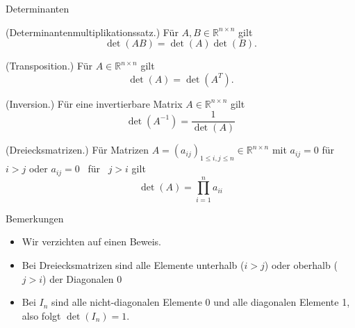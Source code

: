 \documentclass[
  8pt,
  ignorenonframetext,
]{beamer}
\providecommand{\tightlist}{%
  \setlength{\itemsep}{0pt}\setlength{\parskip}{0pt}}
\begin{document}
\begin{frame}{Determinanten}
\protect\hypertarget{determinanten-5}{}
\footnotesize
\begin{theorem}
\normalfont
(Determinantenmultiplikationssatz.) Für $A,B \in \mathbb{R}^{n \times n}$ gilt
\begin{equation}
\det(AB) = \det(A)\det(B).
\end{equation}

(Transposition.) Für $A \in \mathbb{R}^{n \times n}$ gilt
\begin{equation}
\det(A) = \det\left(A^T\right).
\end{equation}

(Inversion.) Für eine invertierbare Matrix $A \in \mathbb{R}^{n \times n}$ gilt
\begin{equation}
\det\left(A^{-1}\right) = \frac{1}{\det(A)}
\end{equation}

(Dreiecksmatrizen.) Für Matrizen
$A = (a_{ij})_{1 \le i,j\le n} \in \mathbb{R}^{n \times n}$
mit $a_{ij} = 0$ für $i > j$ oder $a_{ij} = 0$ \mbox{ für } $j > i$ gilt
\begin{equation}
\det(A) = \prod_{i=1}^n a_{ii}
\end{equation}
\end{theorem}
\footnotesize

Bemerkungen

\begin{itemize}
\tightlist
\item
  Wir verzichten auf einen Beweis.
\item
  Bei Dreiecksmatrizen sind alle Elemente unterhalb (\(i > j\)) oder
  oberhalb (\(j > i\)) der Diagonalen 0
\item
  Bei \(I_n\) sind alle nicht-diagonalen Elemente 0 und alle diagonalen
  Elemente 1, also folgt \(\det(I_n) = 1\).
\end{itemize}
\end{frame}
\end{document}
